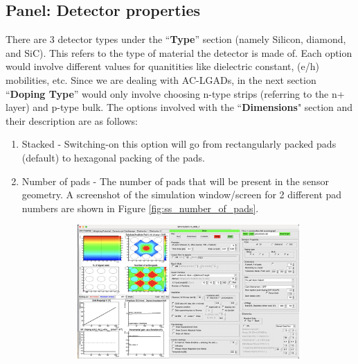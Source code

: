 \documentclass[11pt]{article}
\begin{document}
\subsection{Panel: Detector properties}
There are 3 detector types under the ``\textbf{Type}'' section (namely Silicon, diamond, and SiC). This refers to the type of material the detector is made of. Each option would involve different values for quanitities like dielectric constant, (e/h) mobilities, etc.
\newline
Since we are dealing with AC-LGADs, in the next section ``\textbf{Doping Type}'' would only involve choosing n-type strips (referring to the n+ layer) and p-type bulk.
\newline
The options involved with the ``\textbf{Dimensions}" section and their description are as follows:
\begin{enumerate}
    \item Stacked - Switching-on this option will go from rectangularly packed pads (default) to hexagonal packing of the pads.
    \item Number of pads - The number of pads that will be present in the sensor geometry. A screenshot of the simulation window/screen for 2 different pad numbers are shown in Figure \ref{fig:ss_number_of_pads}.
    \begin{figure}[h!]
        \centering
        \begin{subfigure}[t]{0.99\textwidth}
            \centering
            \includegraphics[width=5in]{Images/3x3_pad_structure.png}
            \caption{}
            \label{fig:3x3_pad_field}
        \end{subfigure}%


\end{figure}
\end{enumerate}
\end{document}
